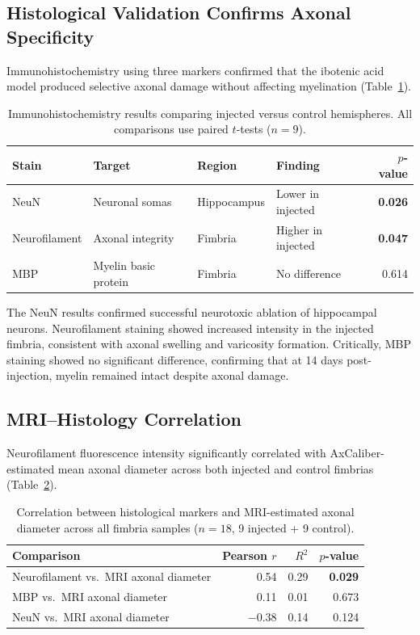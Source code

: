 \documentclass[11pt]{article}
\begin{document}
\subsection{Histological Validation Confirms Axonal Specificity}

Immunohistochemistry using three markers confirmed that the ibotenic acid model produced selective axonal damage without affecting myelination (Table~\ref{tab:ihc}).

\begin{table}[H]
\centering
\caption{Immunohistochemistry results comparing injected versus control hemispheres. All comparisons use paired $t$-tests ($n = 9$).}
\label{tab:ihc}
\begin{tabular}{llllr}
\toprule
\textbf{Stain} & \textbf{Target} & \textbf{Region} & \textbf{Finding} & \textbf{$p$-value} \\
\midrule
NeuN & Neuronal somas & Hippocampus & Lower in injected & \textbf{0.026} \\
Neurofilament & Axonal integrity & Fimbria & Higher in injected & \textbf{0.047} \\
MBP & Myelin basic protein & Fimbria & No difference & 0.614 \\
\bottomrule
\end{tabular}
\end{table}

The NeuN results confirmed successful neurotoxic ablation of hippocampal neurons. Neurofilament staining showed increased intensity in the injected fimbria, consistent with axonal swelling and varicosity formation. Critically, MBP staining showed no significant difference, confirming that at 14 days post-injection, myelin remained intact despite axonal damage.

\subsection{MRI--Histology Correlation}

Neurofilament fluorescence intensity significantly correlated with AxCaliber-estimated mean axonal diameter across both injected and control fimbrias (Table~\ref{tab:correlation}).

\begin{table}[H]
\centering
\caption{Correlation between histological markers and MRI-estimated axonal diameter across all fimbria samples ($n = 18$, 9 injected + 9 control).}
\label{tab:correlation}
\begin{tabular}{lrrr}
\toprule
\textbf{Comparison} & \textbf{Pearson $r$} & \textbf{$R^2$} & \textbf{$p$-value} \\
\midrule
Neurofilament vs.\ MRI axonal diameter & 0.54 & 0.29 & \textbf{0.029} \\
MBP vs.\ MRI axonal diameter & 0.11 & 0.01 & 0.673 \\
NeuN vs.\ MRI axonal diameter & $-0.38$ & 0.14 & 0.124 \\
\bottomrule
\end{tabular}
\end{table}
\end{document}
